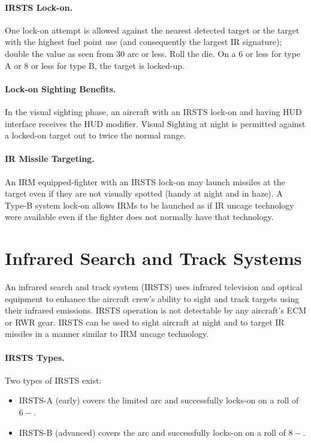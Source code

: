 \begin{advancedrules}
{\paragraph{IRSTS Lock-on.} One lock-on attempt is allowed against the nearest detected target or the target with the highest fuel point use (and consequently the largest IR signature); double the value as seen from 30{\deg} arc or less. Roll the die. On a 6 or less for type A or 8 or less for type B, the target is locked-up.

\paragraph{Lock-on Sighting Benefits.} In the visual sighting phase, an aircraft with an IRSTS lock-on and having HUD interface receives the HUD modifier. Visual Sighting at night is permitted against a locked-on target out to twice the normal range.

\paragraph{IR Missile Targeting.} An IRM equipped-fighter with an IRSTS lock-on may launch missiles at the target even if they are not visually spotted (handy at night and in haze).  A Type-B system lock-on allows IRMs to be launched as if IR uncage technology were available even if the fighter does not normally have that technology.
}{

\section{Infrared Search and Track Systems}
\label{rule:irsts}

An infrared search and track system (IRSTS) uses infrared television and optical equipment to enhance the aircraft crew’s ability to sight and track targets using their infrared emissions. IRSTS operation is not detectable by any aircraft’s ECM or RWR gear. IRSTS can be used to sight aircraft at night and to target IR missiles in a manner similar to IRM uncage technology.

\paragraph{IRSTS Types.} Two types of IRSTS exist: 
\begin{itemize}
    \item IRSTS-A (early) covers the limited  arc and successfully locks-on on a roll of $6-$.
    \item IRSTS-B (advanced) covers the   arc and successfully locks-on on a roll of $8-$.
\end{itemize}

}
\end{advancedrules}
